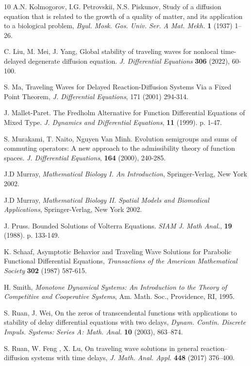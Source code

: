 \documentclass[12pt,letterpaper]{amsart}
\theoremstyle{definition}
\theoremstyle{remark}
\numberwithin{equation}{section}
\begin{document}
\begin{thebibliography}{10}
A.N. Kolmogorov, I.G. Petrovskii, N.S. Piskunov, Study of a diffusion equation that is related to the growth of a
quality of matter, and its application to a biological problem, \textit{Byul. Mosk. Gos. Univ. Ser. A Mat. Mekh.} \textbf{1} (1937) 1–26.

C. Liu,  M. Mei,  J. Yang, Global stability of traveling waves for nonlocal time-delayed degenerate diffusion equation. {\it J. Differential Equations} {\bf 306} (2022), 60-100.

S. Ma, Traveling Waves for Delayed Reaction-Diffusion Systems Via a Fixed Point Theorem, \textit{J. Differential Equations}, 171 (2001) 294-314.

J. Mallet-Paret. The Fredholm Alternative for Function Differential Equations of Mixed Type. {\it J. Dynamics and Differential Equations}, {\bf 11} (1999). p. 1-47.

S. Murakami, T. Naito, Nguyen Van Minh. 
Evolution semigroups and sums of commuting operators: A new approach to the admissibility theory of function spaces. {\it J. Differential Equations}, {\bf 164} (2000),  240-285.

J.D Murray, \textit{Mathematical Biology I. An Introduction}, Springer-Verlag, New York  2002.

J.D Murray, \textit{Mathematical Biology II. Spatial Models and Biomedical Applications}, Springer-Verlag, New York  2002.

J. Pruss. Bounded Solutions of Volterra Equations. {\it  SIAM J. Math Anal.}, {\bf 19} (1988). p. 133-149.

K. Schaaf, Asymptotic Behavior and Traveling Wave Solutions for Parabolic Functional Differential Equations,\textit{ Transactions of the American Mathematical Society} \textbf{302} (1987) 587-615.

H. Smith, \textit{Monotone Dynamical Systems: An Introduction to the Theory of Competitive and
Cooperative Systems}, Am. Math. Soc., Providence, RI, 1995.

S. Ruan, J. Wei, On the zeros of transcendental functions with applications
to stability of delay differential equations with two delays, \textit{Dynam. Contin. Discrete Impuls. Systems: Series A: Math. Anal.} \textbf{10} (2003), 863–874.

S. Ruan, W. Feng , X. Lu, On traveling wave solutions in general reaction–diffusion systems with time delays,
\textit{J. Math. Anal. Appl.} \textbf{448} (2017) 376–400.


\end{thebibliography}
\end{document}

